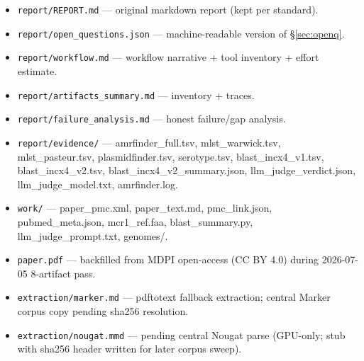 \documentclass[11pt]{article}
\begin{document}
\begin{itemize}
  \item \texttt{report/REPORT.md} --- original markdown report (kept per standard).
  \item \texttt{report/open\_questions.json} --- machine-readable version of \S\ref{sec:openq}.
  \item \texttt{report/workflow.md} --- workflow narrative + tool inventory + effort estimate.
  \item \texttt{report/artifacts\_summary.md} --- inventory + traces.
  \item \texttt{report/failure\_analysis.md} --- honest failure/gap analysis.
  \item \texttt{report/evidence/} --- amrfinder\_full.tsv, mlst\_warwick.tsv, mlst\_pasteur.tsv, plasmidfinder.tsv, serotype.tsv, blast\_incx4\_v1.tsv, blast\_incx4\_v2.tsv, blast\_incx4\_v2\_summary.json, llm\_judge\_verdict.json, llm\_judge\_model.txt, amrfinder.log.
  \item \texttt{work/} --- paper\_pmc.xml, paper\_text.md, pmc\_link.json, pubmed\_meta.json, mcr1\_ref.faa, blast\_summary.py, llm\_judge\_prompt.txt, genomes/.
  \item \texttt{paper.pdf} --- backfilled from MDPI open-access (CC BY 4.0) during 2026-07-05 8-artifact pass.
  \item \texttt{extraction/marker.md} --- pdftotext fallback extraction; central Marker corpus copy pending sha256 resolution.
  \item \texttt{extraction/nougat.mmd} --- pending central Nougat parse (GPU-only; stub with sha256 header written for later corpus sweep).
\end{itemize}
\end{document}
